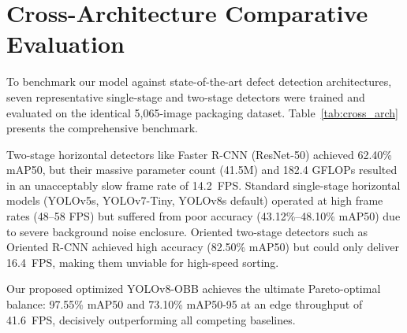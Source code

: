 \section{Cross-Architecture Comparative Evaluation}
\label{sec:cross_arch}

To benchmark our model against state-of-the-art defect detection architectures, seven representative single-stage and two-stage detectors were trained and evaluated on the identical 5,065-image packaging dataset. Table~\ref{tab:cross_arch} presents the comprehensive benchmark.

Two-stage horizontal detectors like Faster R-CNN (ResNet-50) achieved 62.40\% mAP50, but their massive parameter count (41.5M) and 182.4 GFLOPs resulted in an unacceptably slow frame rate of 14.2~FPS. Standard single-stage horizontal models (YOLOv5s, YOLOv7-Tiny, YOLOv8s default) operated at high frame rates (48--58 FPS) but suffered from poor accuracy (43.12\%--48.10\% mAP50) due to severe background noise enclosure. Oriented two-stage detectors such as Oriented R-CNN achieved high accuracy (82.50\% mAP50) but could only deliver 16.4~FPS, making them unviable for high-speed sorting.

Our proposed optimized YOLOv8-OBB achieves the ultimate Pareto-optimal balance: 97.55\% mAP50 and 73.10\% mAP50-95 at an edge throughput of 41.6~FPS, decisively outperforming all competing baselines.


